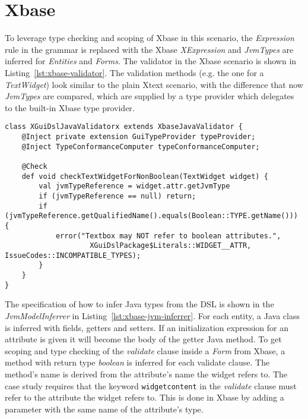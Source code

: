 \section{Xbase}
\label{sec:xbase}

To leverage type checking and scoping of Xbase in this scenario, the
\emph{Expression} rule in the grammar is replaced with the Xbase
\emph{XExpression} and \emph{JvmTypes} are inferred for \emph{Entities} and
\emph{Forms}.
The validator in the Xbase scenario is shown in
Listing~\ref{lst:xbase-validator}. The validation methods (e.g. the one for a
\emph{TextWidget}) look similar to the plain Xtext scenario, with the difference
that now \emph{JvmTypes} are compared, which are supplied by a type provider
which delegates to the built-in Xbase type provider.


\begin{lstlisting}[language=xtend,float=tb,label=lst:xbase-validator,caption=Xtext
validator in the Xbase scenario.] 
class XGuiDslJavaValidatorx extends XbaseJavaValidator {
	@Inject private extension GuiTypeProvider typeProvider;
	@Inject TypeConformanceComputer typeConformanceComputer;

	@Check
	def void checkTextWidgetForNonBoolean(TextWidget widget) {
		val jvmTypeReference = widget.attr.getJvmType
		if (jvmTypeReference == null) return;
		if (jvmTypeReference.getQualifiedName().equals(Boolean::TYPE.getName())) {
			error("Textbox may NOT refer to boolean attributes.",
					XGuiDslPackage$Literals::WIDGET__ATTR, IssueCodes::INCOMPATIBLE_TYPES);
		}
	}
}
\end{lstlisting}

The specification of how to infer Java types from the DSL is shown in the
\emph{JvmModelInferrer} in Listing~\ref{lst:xbase-jvm-inferrer}.  For each
entity, a Java class is inferred with fields, getters and setters.
If an initialization expression for an attribute is given it will become the
body of the getter Java method.  To get scoping and type checking of the
\emph{validate} clause inside a \emph{Form} from Xbase, a method with return type \emph{boolean} is inferred for
each validate clause. The method's name is derived from the attribute's name the
widget refers to. The case study requires that the keyword \verb|widgetcontent|
in the \emph{validate} clause must refer to the attribute the widget refers to.
This is done in Xbase by adding a parameter with the same name of the
attribute's type. 

